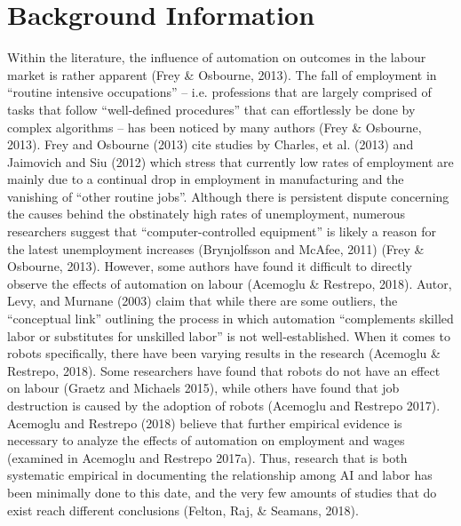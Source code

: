 \documentclass[12pt]{article}
\begin{document}
\newpage

\tableofcontents
\listoftables
\listoffigures

\newpage

\section{Background Information}

\begin{flushleft}
Within the literature, the influence of automation on outcomes in the labour market is rather apparent (Frey \& Osbourne, 2013). The fall of employment in ``routine intensive occupations” – i.e. professions that are largely comprised of tasks that follow ``well-defined procedures” that can effortlessly be done by complex algorithms – has been noticed by many authors (Frey \& Osbourne, 2013). Frey and Osbourne (2013) cite studies by Charles, et al. (2013) and Jaimovich and Siu (2012) which stress that currently low rates of employment are mainly due to a continual drop in employment in manufacturing and the vanishing of ``other routine jobs”. Although there is persistent dispute concerning the causes behind the obstinately high rates of unemployment, numerous researchers suggest that ``computer-controlled equipment” is likely a reason for the latest unemployment increases (Brynjolfsson and McAfee, 2011) (Frey \& Osbourne, 2013).
\break
\linebreak
However, some authors have found it difficult to directly observe the effects of automation on labour (Acemoglu \& Restrepo, 2018). Autor, Levy, and Murnane (2003) claim that while there are some outliers, the ``conceptual link” outlining the process in which automation ``complements skilled labor or substitutes for unskilled labor” is not well-established. When it comes to robots specifically, there have been varying results in the research (Acemoglu \& Restrepo, 2018). Some researchers have found that robots do not have an effect on labour (Graetz and Michaels 2015), while others have found that job destruction is caused by the adoption of robots (Acemoglu and Restrepo 2017). Acemoglu and Restrepo (2018) believe that further empirical evidence is necessary to analyze the effects of automation on employment and wages (examined in Acemoglu and Restrepo 2017a). Thus, research that is both systematic empirical in documenting the relationship among AI and labor has been minimally done to this date, and the very few amounts of studies that do exist reach different conclusions (Felton, Raj, \& Seamans, 2018). 

\end{flushleft}
\end{document}
